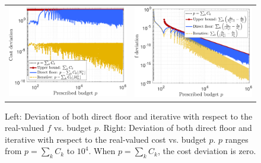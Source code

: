 %
\begin{figure}[!t]\centering
\begin{tabular}{cc}
\includegraphics[width=0.48\linewidth]{./Figures/Eg2_Cost.pdf} &
\includegraphics[width=0.48\linewidth]{./Figures/Eg2_f.pdf}
\end{tabular}
\caption{
Left: Deviation of both direct floor and iterative with respect to the real-valued $f$ vs. budget  $p$.
Right: Deviation of both direct floor and iterative with respect to the real-valued cost vs. budget  $p$. $p$ ranges from $p=\sum_{k}C_k$ to $10^4$. When $p=\sum_{k}C_k$, the cost deviation is zero.
} 
\label{fig:Eg2} 
\end{figure}
%




















